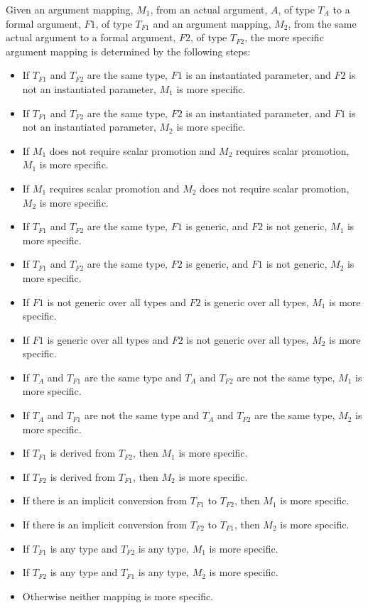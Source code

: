 Given an argument mapping, $M_1$, from an actual argument, $A$, of
type $T_A$ to a formal argument, $F1$, of type $T_{F1}$ and an
argument mapping, $M_2$, from the same actual argument to a formal
argument, $F2$, of type $T_{F2}$, the more specific argument mapping
is determined by the following steps:
\begin{itemize}
\item
 If $T_{F1}$ and $T_{F2}$ are the same type, $F1$ is an instantiated
 parameter, and $F2$ is not an instantiated parameter, $M_1$ is more
 specific.
\item
 If $T_{F1}$ and $T_{F2}$ are the same type, $F2$ is an instantiated
 parameter, and $F1$ is not an instantiated parameter, $M_2$ is more
 specific.
\item
 If $M_1$ does not require scalar promotion and $M_2$ requires scalar
 promotion, $M_1$ is more specific.
\item
 If $M_1$ requires scalar promotion and $M_2$ does not require scalar
 promotion, $M_2$ is more specific.
\item
 If $T_{F1}$ and $T_{F2}$ are the same type, $F1$ is generic, and $F2$
 is not generic, $M_1$ is more specific.
\item
 If $T_{F1}$ and $T_{F2}$ are the same type, $F2$ is generic, and $F1$
 is not generic, $M_2$ is more specific.
\item
 If $F1$ is not generic over all types and $F2$ is generic over all
 types, $M_1$ is more specific.
\item
 If $F1$ is generic over all types and $F2$ is not generic over all
 types, $M_2$ is more specific.
\item
 If $T_A$ and $T_{F1}$ are the same type and $T_A$ and $T_{F2}$ are
 not the same type, $M_1$ is more specific.
\item
 If $T_A$ and $T_{F1}$ are not the same type and $T_A$ and $T_{F2}$
 are the same type, $M_2$ is more specific.
\item
 If $T_{F1}$ is derived from $T_{F2}$, then $M_1$ is more specific.
\item
 If $T_{F2}$ is derived from $T_{F1}$, then $M_2$ is more specific.
\item
 If there is an implicit conversion from $T_{F1}$ to $T_{F2}$, then
 $M_1$ is more specific.
\item
 If there is an implicit conversion from $T_{F2}$ to $T_{F1}$, then
 $M_2$ is more specific.
\item
 If $T_{F1}$ is any  type and $T_{F2}$ is any 
 type, $M_1$ is more specific.
\item
 If $T_{F2}$ is any  type and $T_{F1}$ is any 
 type, $M_2$ is more specific.
\item
 Otherwise neither mapping is more specific.
\end{itemize}
